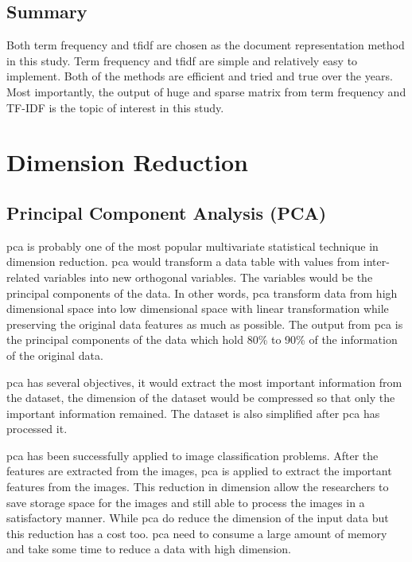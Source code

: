 \subsection{Summary}
Both term frequency and \ac{tfidf} are chosen as the document representation method in this study. Term frequency and \ac{tfidf} are simple and relatively easy to implement. Both of the methods are efficient and tried and true over the years. Most importantly, the output of huge and sparse matrix from term frequency and TF-IDF is the topic of interest in this study.\\

\clearpage
\section{Dimension Reduction}
\subsection{Principal Component Analysis (PCA)}
\Ac{pca} is probably one of the most popular multivariate statistical technique in dimension reduction. \Ac{pca} would transform a data table with values from inter-related variables into new orthogonal variables. The variables would be the principal components of the data. In other words, \ac{pca} transform data from high dimensional space into low dimensional space with linear transformation while preserving the original data features as much as possible. \cite{pcaImage} The output from \ac{pca} is the principal components of the data which hold 80\% to 90\% of the information of the original data.

\Ac{pca} has several objectives, it would extract the most important information from the dataset, the dimension of the dataset would be compressed so that only the important information remained. The dataset is also simplified after \ac{pca} has processed it. \cite{pcaObj}

\Ac{pca} has been successfully applied to image classification problems. After the features are extracted from the images, \ac{pca} is applied to extract the important features from the images. This reduction in dimension allow the researchers to save storage space for the images and still able to process the images in a satisfactory manner. While \ac{pca} do reduce the dimension of the input data but this reduction has a cost too. \Ac{pca} need to consume a large amount of memory and take some time to reduce a data with high dimension. \cite{pcaImage}

